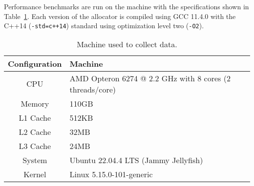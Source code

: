 Performance benchmarks are run on the machine with the specifications shown in Table~\ref{table:machine}. Each version of the allocator is compiled using GCC 11.4.0 with the C++14 (\texttt{-std=c++14}) standard using optimization level two (\texttt{-O2}).

\begin{table}[H]
    \centering
\begin{tabular}{cp{11.3cm}}
    \textbf{Configuration} & \textbf{Machine} \\ \hline
CPU           & AMD Opteron 6274 @ 2.2 GHz with 8 cores (2 threads/core)\\ \hline
Memory        & 110GB                                                   \\ \hline
L1 Cache      & 512KB                                                   \\ \hline
L2 Cache      & 32MB                                                    \\ \hline
L3 Cache      & 24MB                                                    \\ \hline
System        & Ubuntu 22.04.4 LTS (Jammy Jellyfish)                    \\ \hline
Kernel        & Linux 5.15.0-101-generic
\end{tabular}
\caption{Machine used to collect data.}
\label{table:machine}
\end{table}
